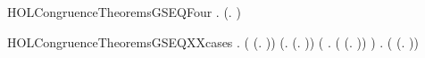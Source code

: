 \newcommand{\HOLCongruenceTheoremsGSEQThreea}{\UseVerbatim{HOLCongruenceTheoremsGSEQThreea}}
\begin{SaveVerbatim}{HOLCongruenceTheoremsGSEQFour}
\HOLTokenTurnstile{} \HOLSymConst{\HOLTokenForall{}}   .
         \HOLSymConst{\HOLTokenConj{}}   \HOLSymConst{\HOLTokenImp{}}  (\HOLTokenLambda{}.   \HOLSymConst{\ensuremath{+}}  )
\end{SaveVerbatim}
\newcommand{\HOLCongruenceTheoremsGSEQFour}{\UseVerbatim{HOLCongruenceTheoremsGSEQFour}}
\begin{SaveVerbatim}{HOLCongruenceTheoremsGSEQXXcases}
\HOLTokenTurnstile{} \HOLSymConst{\HOLTokenForall{}}.
         \HOLSymConst{\HOLTokenEquiv{}}
       ( \HOLSymConst{=} (\HOLTokenLambda{}. )) \HOLSymConst{\HOLTokenDisj{}} (\HOLSymConst{\HOLTokenExists{}}.  \HOLSymConst{=} (\HOLTokenLambda{}. )) \HOLSymConst{\HOLTokenDisj{}}
       (\HOLSymConst{\HOLTokenExists{}} . ( \HOLSymConst{=} (\HOLTokenLambda{}.  )) \HOLSymConst{\HOLTokenConj{}}  ) \HOLSymConst{\HOLTokenDisj{}}
       \HOLSymConst{\HOLTokenExists{}}   .
           ( \HOLSymConst{=} (\HOLTokenLambda{}.   \HOLSymConst{\ensuremath{+}}  )) \HOLSymConst{\HOLTokenConj{}}   \HOLSymConst{\HOLTokenConj{}}  
\end{SaveVerbatim}
\newcommand{\HOLCongruenceTheoremsGSEQXXcases}{\UseVerbatim{HOLCongruenceTheoremsGSEQXXcases}}
